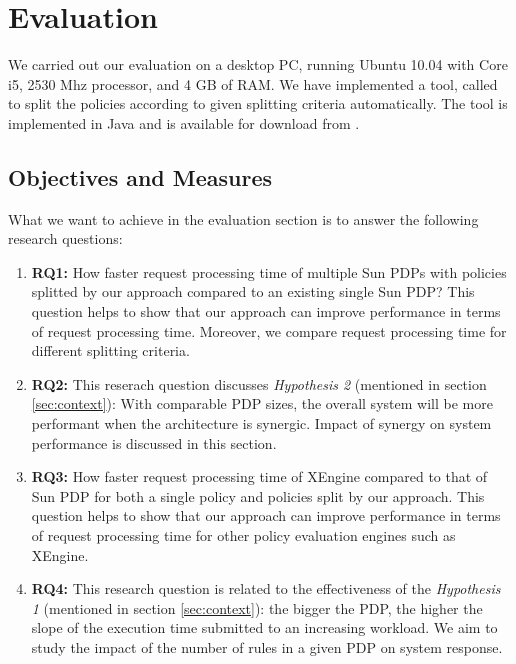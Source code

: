 
\section{Evaluation} \label{sec:experiment}
We carried out our evaluation on a desktop PC, running Ubuntu 10.04 with Core i5, 2530 Mhz processor, and 4 GB of RAM. 
We have implemented a tool, called  to split the policies according to given splitting criteria automatically.
The tool is implemented in Java and is available for download from \cite{splitter}.

\subsection{Objectives and Measures}
What we want to achieve in the evaluation section is to answer the following research questions:
\begin{enumerate}
\item \textbf{RQ1:} How faster request processing time of multiple Sun PDPs with policies splitted by our approach compared
to an existing single Sun PDP? This question helps to show that our approach can improve performance in terms of request processing time. 
Moreover, we compare request processing time for different splitting criteria.
\item \textbf{RQ2:} This reserach question discusses \textit{Hypothesis 2} (mentioned in section \ref{sec:context}): 
With comparable PDP sizes, the overall system will be more performant when the architecture is synergic. 
Impact of synergy on system performance is discussed in this section.
\item \textbf{RQ3:} How faster request processing time of XEngine compared
to that of Sun PDP for both a single policy and policies split by our approach.
This question helps to show that our approach can improve performance in terms of request processing time for other policy evaluation 
engines such as XEngine.
\item \textbf{RQ4:} This research question is related to the effectiveness of the \textit{Hypothesis 1} 
(mentioned in section \ref{sec:context}): the bigger the PDP, the higher the slope of the execution 
time submitted to an increasing workload. We aim to study the impact of the number of rules in a given PDP on system response.
\end{enumerate}

